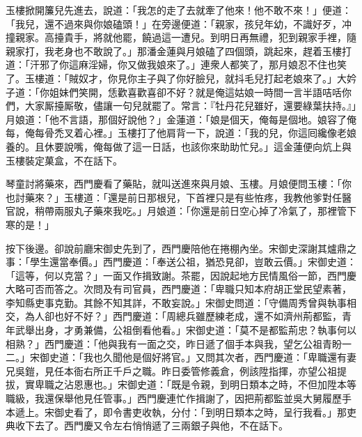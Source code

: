 玉樓掀開簾兒先進去，說道：「我怎的走了去就牽了他來！他不敢不來！」{}便道：「我兒，還不過來與你娘磕頭！」在旁邊便道：「親家，孩兒年幼，不識好歹，冲撞親家。高擡貴手，將就他罷，饒過這一遭兒。到明日再無禮，{}犯到親家手裡，隨親家打，我老身也不敢說了。」{}那潘金蓮與月娘磕了四個頭，跳起來，趕着玉樓打道：「汗邪了你這麻淫婦，你又做我娘來了。」連衆人都笑了，那月娘忍不住也笑了。{}玉樓道：「賊奴才，你見你主子與了你好臉兒，就抖毛兒打起老娘來了。」大妗子道：「你姐妹們笑開，恁歡喜歡喜卻不好？就是俺這姑娘一時間一言半語咭咶你們，大家厮擡厮敬，儘讓一句兒就罷了。常言：『牡丹花兒雖好，還要綠葉扶持。』」月娘道：「他不言語，那個好說他？」金蓮道：「娘是個天，俺每是個地。娘容了俺每，俺每骨禿叉着心裡。」玉樓打了他肩背一下，說道：「我的兒，你這囘纔像老娘養的。且休要說嘴，俺每做了這一日話，也該你來助助忙兒。」這金蓮便向炕上與玉樓裝定菓盒，不在話下。

琴童討將藥來，西門慶看了藥貼，就叫送進來與月娘、玉樓。月娘便問玉樓：「你也討藥來？」玉樓道：「還是前日那根兒，下首裡只是有些恠疼，我教他爹對任醫官說，稍帶兩服丸子藥來我吃。」月娘道：「你還是前日空心掉了冷氣了，那裡管下寒的是！」

按下後邊。卻說前廳宋御史先到了，西門慶陪他在捲棚內坐。宋御史深謝其爐鼎之事：「學生還當奉價。」西門慶道：「奉送公祖，猶恐見卻，豈敢云價。」宋御史道：「這等，何以克當？」一面又作揖致謝。茶罷，因說起地方民情風俗一節，西門慶大略可否而答之。次問及有司官員，{}西門慶道：「卑職只知本府胡正堂民望素著，李知縣吏事克勤。其餘不知其詳，不敢妄說。」宋御史問道：「守備周秀曾與執事相交，為人卻也好不好？」西門慶道：「周總兵雖歷練老成，還不如濟州荊都監，青年武舉出身，才勇兼備，公祖倒看他看。」宋御史道：「莫不是都監荊忠？執事何以相熟？」西門慶道：「他與我有一面之交，昨日遞了個手本與我，望乞公祖青盼一二。」宋御史道：「我也久聞他是個好將官。」又問其次者，西門慶道：「卑職還有妻兄吳鎧，見任本衙右所正千戶之職。昨日委管修義倉，例該陞指揮，亦望公祖提拔，實卑職之沾恩惠也。」宋御史道：「既是令親，到明日類本之時，不但加陞本等職級，我還保舉他見任管事。」西門慶連忙作揖謝了，因把荊都監並吳大舅履歷手本遞上。宋御史看了，即令書吏收執，分付：「到明日類本之時，呈行我看。」那吏典收下去了。西門慶又令左右悄悄遞了三兩銀子與他，不在話下。

